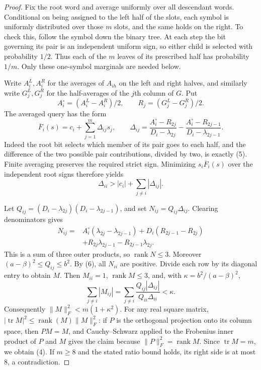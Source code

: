 \documentclass[11pt]{article}
\begin{document}
\begin{proof}
Fix the root word and average uniformly over all descendant words.
Conditional on being assigned to the left half of the slots, each
symbol is uniformly distributed over those $m$ slots, and the same
holds on the right. To check this, follow the symbol down the binary
tree. At each step the bit governing its pair is an independent
uniform sign, so either child is selected with probability $1/2$.
Thus each of the $m$ leaves of its prescribed half has probability
$1/m$. Only these one-symbol marginals are needed below.

Write $A_i^L,A_i^R$ for the averages of $A_{ih}$ on the left and
right halves, and similarly write $G_j^L,G_j^R$ for the half-averages
of the $j$th column of $G$. Put
\[
 A_i^\circ=(A_i^L-A_i^R)/2,
 \qquad R_j=(G_j^L-G_j^R)/2.
\]
The averaged query has the form
\[
 \overline F_i(s)=c_i+\sum_{j=1}^m\Delta_{ij}s_j,
 \qquad
 \Delta_{ij}=
 \frac{A_i^\circ-R_{2j}}{D_i-\lambda_{2j}}
 -\frac{A_i^\circ-R_{2j-1}}{D_i-\lambda_{2j-1}}. \tag{5}
\]
Indeed the root bit selects which member of its pair goes to each
half, and the difference of the two possible pair contributions,
divided by two, is exactly (5). Finite averaging preserves the
required strict sign. Minimizing $s_i\overline F_i(s)$ over the
independent root signs therefore yields
\[
 \Delta_{ii}>|c_i|+\sum_{j\ne i}|\Delta_{ij}|. \tag{6}
\]

Let $Q_{ij}=(D_i-\lambda_{2j})(D_i-\lambda_{2j-1})$, and set
$N_{ij}=Q_{ij}\Delta_{ij}$. Clearing denominators gives
\[
 \begin{split}
 N_{ij}={}&A_i^\circ(\lambda_{2j}-\lambda_{2j-1})
       +D_i(R_{2j-1}-R_{2j})\\
       &+R_{2j}\lambda_{2j-1}-R_{2j-1}\lambda_{2j}.
 \end{split}
\]
This is a sum of three outer products, so $\operatorname{rank}N\leq3$.
Moreover $(a-\beta)^2\leq Q_{ij}\leq b^2$. By (6), all $N_{ii}$
are positive. Divide each row by its diagonal entry to obtain $M$.
Then $M_{ii}=1$, $\operatorname{rank}M\leq3$, and, with
$\kappa=b^2/(a-\beta)^2$,
\[
 \sum_{j\ne i}|M_{ij}|
 =\sum_{j\ne i}\frac{Q_{ij}|\Delta_{ij}|}
                         {Q_{ii}\Delta_{ii}}
 <\kappa.
\]
Consequently $\|M\|_F^2<m(1+\kappa^2)$. For any real square
matrix, $|\operatorname{tr}M|^2\leq
\operatorname{rank}(M)\|M\|_F^2$: if $P$ is the orthogonal
projection onto its column space, then $PM=M$, and Cauchy--Schwarz
applied to the Frobenius inner product of $P$ and $M$ gives the
claim because $\|P\|_F^2=\operatorname{rank}M$.
Since $\operatorname{tr}M=m$, we obtain (4). If $m\geq8$ and the
stated ratio bound holds, its right side is at most $8$, a
contradiction.
\end{proof}
\end{document}

